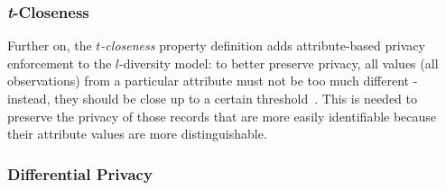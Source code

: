 \subsubsection{\textit{t}-Closeness}

Further on, the \textit{$t$-closeness} property definition adds attribute-based privacy enforcement to the $l$-diversity model: to better preserve privacy, all values (all observations) from a particular attribute must not be too much different - instead, they should be close up to a certain threshold~\citep{Ninghui:tCloseness}. This is needed to preserve the privacy of those records that are more easily identifiable because their attribute values are more distinguishable.

\subsubsection{Differential Privacy}

